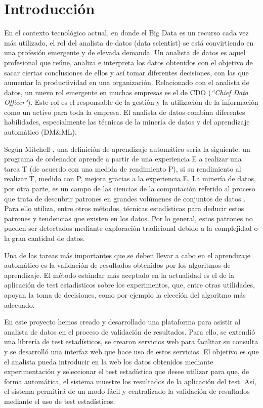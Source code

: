 
\chapter{Introducción}
En el contexto tecnológico actual, en donde el Big Data es un recurso cada vez más utilizado, el rol
del analista de datos (data scientist) se está convirtiendo en una profesión emergente y de elevada
demanda. Un analista de datos es aquel profesional que reúne, analiza e interpreta los datos obtenidos
con el objetivo de sacar ciertas conclusiones de ellos y así tomar diferentes decisiones, con las que
aumentar la productividad en una organización. Relacionado con el analista de datos, un nuevo rol emergente
en muchas empresas es el de CDO (\textit{``Chief Data Officer"}). Este rol es el responsable de la gestión
y la utilización de la información como un activo para toda la empresa. El analista de datos combina diferentes
habilidades, especialmente las técnicas de la minería de datos y del aprendizaje automático (DM\&ML).

Según Mitchell \cite{mitchell}, una definición de aprendizaje automático sería la siguiente: un programa
de ordenador aprende a partir de una experiencia E a realizar una tarea T (de acuerdo con una medida de
rendimiento P), si su rendimiento al realizar T, medido con P, mejora gracias a la experiencia E. La
minería de datos, por otra parte, es un campo de las ciencias de la computación referido al proceso que trata
de descubrir patrones en grandes volúmenes de conjuntos de datos \cite{mineria}. Para ello utiliza, entre
otros métodos, técnicas estadísticas para deducir estos patrones y tendencias que existen en los datos. Por
lo general, estos patrones no pueden ser detectados mediante exploración tradicional debido a la complejidad o
la gran cantidad de datos.

Una de las tareas más importantes que se deben llevar a cabo en el aprendizaje automático es la
validación de resultados obtenidos por los algoritmos de aprendizaje. El método estándar más aceptado
en la actualidad es el de la aplicación de test estadísticos sobre los experimentos, que, entre otras
utilidades, apoyan la toma de decisiones, como por ejemplo la elección del algoritmo más adecuado.

En este proyecto hemos creado y desarrollado una plataforma para asistir al analista de
datos en el proceso de validación de resultados. Para ello, se extendió una librería de test
estadísticos, se crearon servicios web para facilitar su consulta y se desarrolló una interfaz web
que hace uso de estos servicios. El objetivo es que el analista pueda introducir en la web los datos obtenidos
mediante experimentación y seleccionar el test estadístico que desee utilizar para que, de forma automática, el
sistema muestre los resultados de la aplicación del test. Así, el sistema permitirá de un modo fácil y
centralizado la validación de resultados mediante el uso de test estadísticos.

